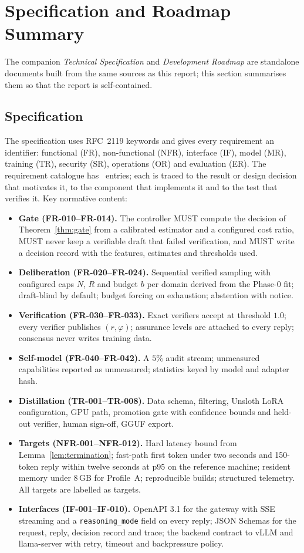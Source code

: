 \section{Specification and Roadmap Summary}
\label{sec:spec}
The companion \emph{Technical Specification} and \emph{Development Roadmap}
are standalone documents built from the same sources as this report; this
section summarises them so that the report is self-contained.

\subsection{Specification}
The specification uses RFC~2119 keywords and gives every requirement an
identifier: functional (FR), non-functional (NFR), interface (IF), model
(MR), training (TR), security (SR), operations (OR) and evaluation (ER). The
requirement catalogue has \NREQ\ entries; each is traced to the result or
design decision that motivates it, to the component that implements it and
to the test that verifies it. Key normative content:
\begin{itemize}
\item \textbf{Gate (FR-010--FR-014).} The controller MUST compute the
decision of Theorem~\ref{thm:gate} from a calibrated estimator and a
configured cost ratio, MUST never keep a verifiable draft that failed
verification, and MUST write a decision record with the features, estimates
and thresholds used.
\item \textbf{Deliberation (FR-020--FR-024).} Sequential verified sampling
with configured caps $N$, $R$ and budget $b$ per domain derived from the
Phase-0 fit; draft-blind by default; budget forcing on exhaustion; abstention
with notice.
\item \textbf{Verification (FR-030--FR-033).} Exact verifiers accept at
threshold $1.0$; every verifier publishes $(r,\varphi)$; assurance levels are
attached to every reply; consensus never writes training data.
\item \textbf{Self-model (FR-040--FR-042).} A $5\%$ audit stream; unmeasured
capabilities reported as unmeasured; statistics keyed by model and adapter
hash.
\item \textbf{Distillation (TR-001--TR-008).} Data schema, filtering, Unsloth
LoRA configuration, GPU path, promotion gate with confidence bounds and
held-out verifier, human sign-off, GGUF export.
\item \textbf{Targets (NFR-001--NFR-012).} Hard latency bound from
Lemma~\ref{lem:termination}; fast-path first token under two seconds and
150-token reply within twelve seconds at p95 on the reference machine;
resident memory under 8\,GB for Profile~A; reproducible builds; structured
telemetry. All targets are labelled as targets.
\item \textbf{Interfaces (IF-001--IF-010).} OpenAPI 3.1 for the gateway
with SSE streaming and a \texttt{reasoning\_mode} field on every reply; JSON
Schemas for the request, reply, decision record and trace; the backend
contract to vLLM and llama-server with retry, timeout and backpressure
policy.
\end{itemize}
